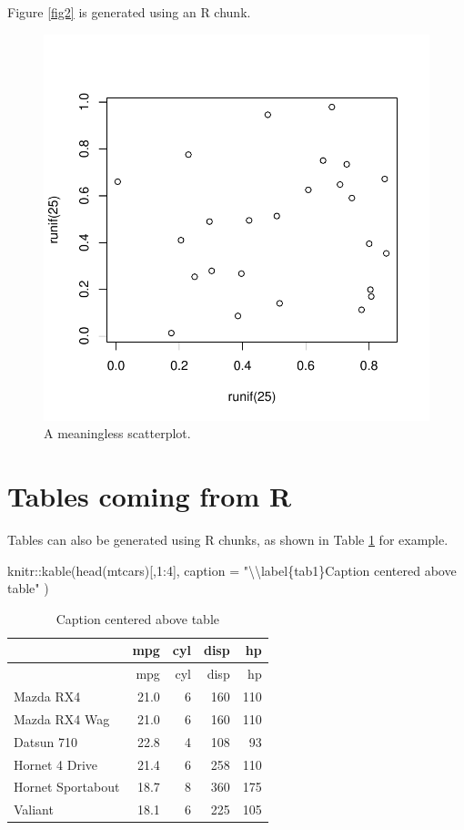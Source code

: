 \documentclass[preprint, 3p,
authoryear]{elsarticle} %
\newenvironment{Shaded}{\begin{snugshade}}{\end{snugshade}}
\newcommand{\AttributeTok}[1]{\textcolor[rgb]{0.77,0.63,0.00}{#1}}
\newcommand{\DecValTok}[1]{\textcolor[rgb]{0.00,0.00,0.81}{#1}}
\newcommand{\FunctionTok}[1]{\textcolor[rgb]{0.00,0.00,0.00}{#1}}
\newcommand{\NormalTok}[1]{#1}
\newcommand{\SpecialCharTok}[1]{\textcolor[rgb]{0.00,0.00,0.00}{#1}}
\newcommand{\StringTok}[1]{\textcolor[rgb]{0.31,0.60,0.02}{#1}}
\begin{document}
Figure \ref{fig2} is generated using an R chunk.

\begin{figure}

{\centering \includegraphics[width=0.5\linewidth]{Manuscript_files/figure-latex/fig2-1} 

}

\caption{\label{fig2}A meaningless scatterplot.}\label{fig:fig2}
\end{figure}

\hypertarget{tables-coming-from-r}{%
\section{Tables coming from R}\label{tables-coming-from-r}}

Tables can also be generated using R chunks, as shown in Table
\ref{tab1} for example.

\begin{Shaded}
\begin{Highlighting}[]
\NormalTok{knitr}\SpecialCharTok{::}\FunctionTok{kable}\NormalTok{(}\FunctionTok{head}\NormalTok{(mtcars)[,}\DecValTok{1}\SpecialCharTok{:}\DecValTok{4}\NormalTok{], }
    \AttributeTok{caption =} \StringTok{"}\SpecialCharTok{\textbackslash{}\textbackslash{}}\StringTok{label\{tab1\}Caption centered above table"}
\NormalTok{)}
\end{Highlighting}
\end{Shaded}

\begin{longtable}[]{@{}lrrrr@{}}
\caption{\label{tab1}Caption centered above table}\tabularnewline
\toprule()
& mpg & cyl & disp & hp \\
\midrule()
\endfirsthead
\toprule()
& mpg & cyl & disp & hp \\
\midrule()
\endhead
Mazda RX4 & 21.0 & 6 & 160 & 110 \\
Mazda RX4 Wag & 21.0 & 6 & 160 & 110 \\
Datsun 710 & 22.8 & 4 & 108 & 93 \\
Hornet 4 Drive & 21.4 & 6 & 258 & 110 \\
Hornet Sportabout & 18.7 & 8 & 360 & 175 \\
Valiant & 18.1 & 6 & 225 & 105 \\
\bottomrule()
\end{longtable}

\renewcommand\refname{References}

\end{document}
